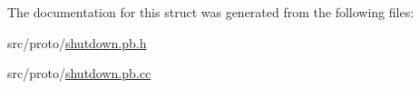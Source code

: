 The documentation for this struct was generated from the following files\+:\begin{DoxyCompactItemize}
\item 
src/proto/\hyperlink{shutdown_8pb_8h}{shutdown.\+pb.\+h}\item 
src/proto/\hyperlink{shutdown_8pb_8cc}{shutdown.\+pb.\+cc}\end{DoxyCompactItemize}

